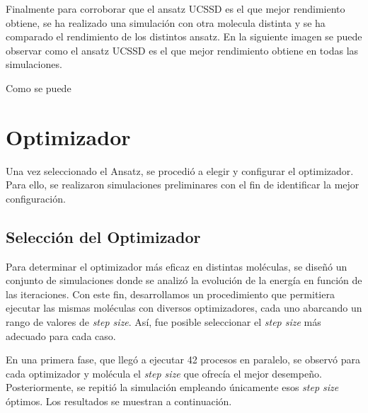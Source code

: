 Finalmente para corroborar que el ansatz UCSSD es el que mejor rendimiento obtiene, se ha realizado una simulación con otra molecula distinta y se ha comparado el rendimiento de los distintos ansatz. En la siguiente imagen se puede observar como el ansatz UCSSD es el que mejor rendimiento obtiene en todas las simulaciones.




Como se puede 
\section{Optimizador}

Una vez seleccionado el Ansatz, se procedió a elegir y configurar el optimizador. Para ello, se realizaron simulaciones preliminares con el fin de identificar la mejor configuración.

\subsection{Selección del Optimizador}
Para determinar el optimizador más eficaz en distintas moléculas, se diseñó un conjunto de simulaciones donde se analizó la evolución de la energía en función de las iteraciones. Con este fin, desarrollamos un procedimiento que permitiera ejecutar las mismas moléculas con diversos optimizadores, cada uno abarcando un rango de valores de \emph{step size}. Así, fue posible seleccionar el \emph{step size} más adecuado para cada caso.

En una primera fase, que llegó a ejecutar 42 procesos en paralelo, se observó para cada optimizador y molécula el \emph{step size} que ofrecía el mejor desempeño. Posteriormente, se repitió la simulación empleando únicamente esos \emph{step size} óptimos. Los resultados se muestran a continuación.

